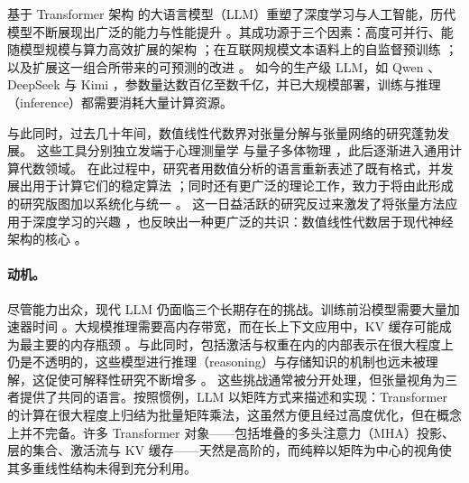 \documentclass[11pt]{article}
\begin{document}
基于 Transformer 架构 \cite{vaswani2017attention} 的大语言模型（LLM）重塑了深度学习与人工智能，历代模型不断展现出广泛的能力与性能提升 \cite{brown2020gpt3, openai2024gpt4, touvron2023llama}。其成功源于三个因素：高度可并行、能随模型规模与算力高效扩展的架构 \cite{vaswani2017attention}；在互联网规模文本语料上的自监督预训练 \cite{radford2019language, raffel2023t5}；以及扩展这一组合所带来的可预测的改进 \cite{kaplan2020scalinglaws, hoffmann2022scalinglaws2}。
如今的生产级 LLM，如 Qwen \cite{yang2025qwen3}、DeepSeek \cite{deepseekai2026deepseekv4} 与 Kimi \cite{kimiteam2026kimik3}，参数量达数百亿至数千亿，并已大规模部署，训练与推理（inference）都需要消耗大量计算资源。

与此同时，过去几十年间，数值线性代数界对张量分解与张量网络的研究蓬勃发展。
这些工具分别独立发端于心理测量学 \cite{tucker1966some, carroll1970analysis, harshman1970foundations} 与量子多体物理 \cite{orus2014practical, verstraete2008peps, vidal2008mera}，此后逐渐进入通用计算代数领域。
在此过程中，研究者用数值分析的语言重新表述了既有格式，并发展出用于计算它们的稳定算法 \cite{lathauwer2000hosvd, oseledets2011tensor, zhao2016tensorring}；同时还有更广泛的理论工作，致力于将由此形成的研究版图加以系统化与统一 \cite{kolda2009tensor, cichocki2015tensor, cichocki2015tensor2}。
这一日益活跃的研究反过来激发了将张量方法应用于深度学习的兴趣 \cite{wang2025tnmeetnn}，也反映出一种更广泛的共识：数值线性代数居于现代神经架构的核心 \cite{baggag2025linalg}。


\paragraph{动机。}
尽管能力出众，现代 LLM 仍面临三个长期存在的挑战。训练前沿模型需要大量加速器时间 \cite{grattafiori2024llama3}。大规模推理需要高内存带宽，而在长上下文应用中，KV 缓存可能成为最主要的内存瓶颈 \cite{kwon2023paggedattn}。与此同时，包括激活与权重在内的内部表示在很大程度上仍是不透明的，这些模型进行推理（reasoning）与存储知识的机制也远未被理解，这促使可解释性研究不断增多 \cite{elhage2021mathematical, elhage2022superposition}。
这些挑战通常被分开处理，但张量视角为三者提供了共同的语言。按照惯例，LLM 以矩阵方式来描述和实现：Transformer 的计算在很大程度上归结为批量矩阵乘法，这虽然方便且经过高度优化，但在概念上并不完备。许多 Transformer 对象——包括堆叠的多头注意力（MHA）投影、层的集合、激活流与 KV 缓存——天然是高阶的，而纯粹以矩阵为中心的视角使其多重线性结构未得到充分利用。
\end{document}

